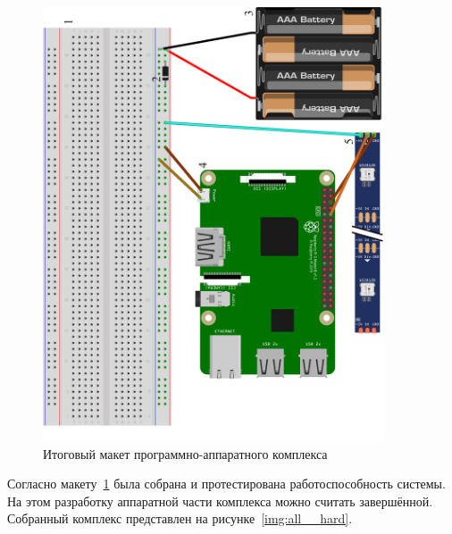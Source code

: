 \begin{figure}[H]
  \centering
  \includegraphics[angle=-90, width=0.9\textwidth]{assets/images/practical/Итоговая архитектура программно-аппаратного комплекса.png}
  \caption{Итоговый макет программно-аппаратного комплекса}
  \label{img:all__schema}
\end{figure}

Согласно макету~\ref{img:all__schema} была собрана и протестирована работоспособность системы. На этом разработку аппаратной части комплекса можно считать завершённой. Собранный комплекс представлен на рисунке~\ref{img:all__hard}.

